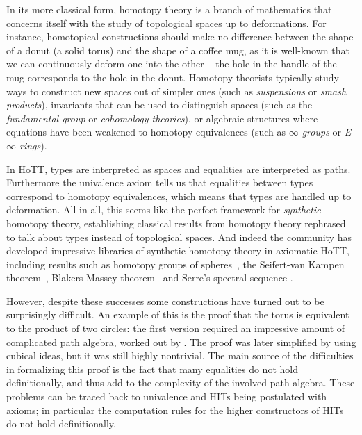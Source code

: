 In its more classical form, homotopy theory is a branch of mathematics that 
concerns itself with the study of topological spaces up to deformations.
%
% 
For instance, homotopical constructions should make no difference between the shape 
of a donut (a solid torus) and the shape of a coffee mug, as it is well-known that 
we can continuously deform one into the other -- the hole in the handle
of the mug corresponds to the hole in the donut.
% 
Homotopy theorists typically study ways to construct new spaces out of simpler 
ones (such as \emph{suspensions} or \emph{smash products}), 
invariants that can be used to distinguish spaces (such as the 
\emph{fundamental group} or \emph{cohomology theories}), or algebraic 
structures where equations have been weakened to homotopy equivalences
(such as \emph{\( \infty \)-groups} or \emph{E\(\infty\)-rings}).

In HoTT, types are interpreted as spaces and equalities
are interpreted as paths. Furthermore the univalence axiom tells us that
equalities between types correspond to homotopy equivalences, which means
that types are handled up to deformation.
% 
All in all, this seems like the perfect framework for \emph{synthetic}
homotopy theory, \ie establishing classical results from homotopy theory
rephrased to talk about types instead of topological spaces.
% 
And indeed the community has developed impressive libraries of synthetic
homotopy theory in axiomatic HoTT, including results such as
homotopy groups of spheres~, the
Seifert-van Kampen theorem~, Blakers-Massey
theorem~ and Serre's spectral sequence 
. 

However, despite these successes some constructions have turned out to be surprisingly
difficult. An example of this is the proof that the torus is
equivalent to the product of two circles: the first version required
an impressive amount of complicated path algebra, worked out by
. The proof was later simplified by
 using cubical ideas, but it was still highly
nontrivial. The main source of the difficulties in formalizing this
proof is the fact that many equalities do not hold definitionally,
and thus add to the complexity of the involved path algebra.
% 
These problems can be traced back to univalence and HITs being postulated
with axioms; in particular the computation rules for the higher constructors 
of HITs do not hold definitionally.


